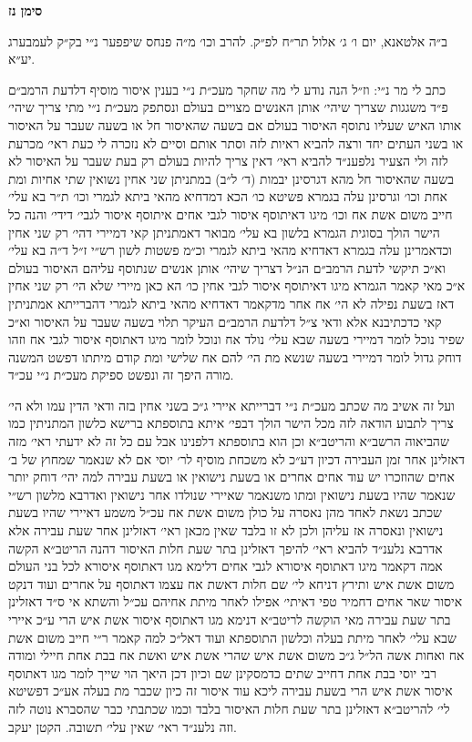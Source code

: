 \documentclass[12pt, openany]{book}
\newcommand{\chapname}{}
\newcommand{\newchap}[1]{
	\addcontentsline{toc}{chapter}{#1}
	\renewcommand{\chapname}{#1}
		\begin{center}
			\textbf{%
\fontsize{16pt}{16pt}\selectfont
				#1}
		\end{center}
}
\begin{document}
\newchap{סימן נז}
\begin{multicols}{2}
ב״ה אלטאנא, יום ו׳ ג׳ אלול תר״ח לפ״ק. להרב וכו׳ מ״ה פנחס שיפפער נ״י בק״ק לעמבערג יע״א.\\\vspace{0pt}

כתב לי מר נ״י: וז״ל הנה נודע לי מה שחקר מעכ״ת נ״י בענין איסור מוסיף דלדעת הרמב״ם פ״ד משגגות שצריך שיהי׳ אותן האנשים מצויים בעולם ונסתפק מעכ״ת נ״י מתי צריך שיהי׳ אותו האיש שעליו נתוסף האיסור בעולם אם בשעה שהאיסור חל או בשעה שעבר על האיסור או בשני העתים יחד ורצה להביא ראיות לזה וסתר אותם וסיים לא נזכרה לי כעת ראי׳ מכרעת לזה ולי הצעיר נלפענ״ד להביא ראי׳ דאין צריך להיות בעולם רק בעת שעבר על האיסור לא בשעה שהאיסור חל מהא דגרסינן יבמות (ד׳ ל״ב) במתניתן שני אחין נשואין שתי אחיות ומת אחת וכו׳ וגרסינן עלה בגמרא פשיטא כו׳ הכא דמדחיא מהאי ביתא לגמרי וכו׳ ת״ר בא עלי׳ חייב משום אשת אח וכו׳ מיגו דאיתוסף איסור לגבי אחים איתוסף איסור לגבי׳ דידי׳ והנה כל הישר הולך בסוגית הגמרא בלשון בא עלי׳ מבואר דאמתניתן קאי דמיירי דהי׳ רק שני אחין וכדאמרינן עלה בגמרא דאדחיא מהאי ביתא לגמרי וכ״מ פשטות לשון רש״י ז״ל ד״ה בא עלי׳ וא״כ תיקשי לדעת הרמב״ם הנ״ל דצריך שיהי׳ אותן אנשים שנתוסף עליהם האיסור בעולם א״כ מאי קאמר הגמרא מיגו דאיתוסף איסור לגבי אחין כו׳ הא כאן מיירי שלא הי׳ רק שני אחין דאז בשעת נפילה לא הי׳ אח אחר מדקאמר דאדחיא מהאי ביתא לגמרי דהברייתא אמתניתין קאי כדכתיבנא אלא ודאי צ״ל דלדעת הרמב״ם העיקר תלוי בשעה שעבר על האיסור וא״כ שפיר נוכל לומר דמיירי בשעה שבא עלי׳ נולד אח ונוכל לומר מיגו דאתוסף איסור לגבי אח וזהו דוחק גדול לומר דמיירי בשעה שנשא מת הי׳ להם אח שלישי ומת קודם מיתתו דפשט המשנה מורה היפך זה ונפשט ספיקת מעכ״ת נ״י עכ״ד.\\\vspace{0pt}

ועל זה אשיב מה שכתב מעכ״ת נ״י דברייתא איירי ג״כ בשני אחין בזה ודאי הדין עמו ולא הי׳ צריך לתבוע הודאה לזה מכל הישר הולך דבפי׳ איתא בתוספתא ברישא כלשון המתניתין כמו שהביאוה הרשב״א והריטב״א וכן הוא בתוספתא דלפנינו אבל עם כל זה לא ידעתי ראי׳ מזה דאזלינן אחר זמן העבירה דכיון דע״כ לא משכחת מוסיף לר׳ יוסי אם לא שנאמר שמחוץ של ב׳ אחים שהוזכרו יש עוד אחים אחרים או בשעת נישואין או בשעת עבירה למה יהי׳ דוחק יותר שנאמר שהיו בשעת נישואין ומתו משנאמר שאיירי שנולדו אחר נישואין ואדרבא מלשון רש״י שכתב נשאת לאחד מהן נאסרה על כולן משום אשת אח עכ״ל משמע דאיירי שהיו בשעת נישואין ונאסרה אז עליהן ולכן לא זו בלבד שאין מכאן ראי׳ דאזלינן אחר שעת עבירה אלא אדרבא נלענ״ד להביא ראי׳ להיפך דאזלינן בתר שעת חלות האיסור דהנה הריטב״א הקשה אמה דקאמר מיגו דאתוסף איסורא לגבי אחים דלימא מגו דאתוסף איסורא לכל בני העולם משום אשת איש ותירץ דניחא לי׳ שם חלות דאשת אח עצמו דאתוסף על אחרים ועוד דנקט איסור שאר אחים דחמיר טפי דאיתי׳ אפילו לאחר מיתת אחיהם עכ״ל והשתא אי ס״ד דאזלינן בתר שעת עבירה מאי הוקשה לריטב״א דנימא מגו דאתוסף איסור אשת איש הרי ע״כ איירי שבא עלי׳ לאחר מיתת בעלה וכלשון התוספתא ועוד דאל״כ למה קאמר ר״י חייב משום אשת אח ואחות אשה הל״ל ג״כ משום אשת איש שהרי אשת איש ואשת אח בבת אחת חיילי ומודה רבי יוסי בבת אחת דחייב שתים כדמסקינן שם וכיון דכן היאך הוי שייך לומר מגו דאתוסף איסור אשת איש הרי בשעת עבירה ליכא עוד איסור זה כיון שכבר מת בעלה אע״כ דפשיטא לי׳ להריטב״א דאזלינן בתר שעת חלות האיסור בלבד וכמו שכתבתי כבר שהסברא נוטה לזה וזה נלענ״ד ראי׳ שאין עלי׳ תשובה. הקטן יעקב.\\\vspace{0pt}


\end{multicols}
\end{document}
